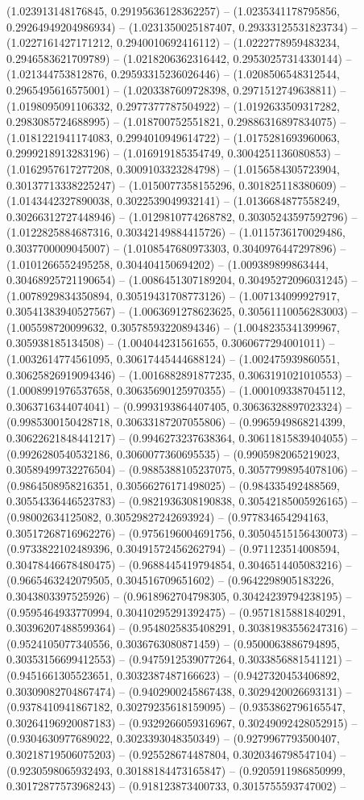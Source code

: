 (1.023913148176845, 0.29195636128362257) -- (1.0235341178795856, 0.29264949204986934) -- (1.0231350025187407, 0.29333125531823734) -- (1.0227161427171212, 0.2940010692416112) -- (1.0222778959483234, 0.2946583621709789) -- (1.0218206362316442, 0.29530257314330144) -- (1.021344753812876, 0.29593315236026446) -- (1.0208506548312544, 0.2965495616575001) -- (1.0203387609728398, 0.2971512749638811) -- (1.0198095091106332, 0.2977377787504922) -- (1.0192633509317282, 0.2983085724688995) -- (1.018700752551821, 0.29886316897834075) -- (1.0181221941174083, 0.2994010949614722) -- (1.0175281693960063, 0.2999218913283196) -- (1.016919185354749, 0.3004251136080853) -- (1.0162957617277208, 0.3009103323284798) -- (1.0156584305723904, 0.30137713338225247) -- (1.0150077358155296, 0.301825118380609) -- (1.0143442327890038, 0.3022539049932141) -- (1.0136684877558249, 0.30266312727448946) -- (1.0129810774268782, 0.30305243597592796) -- (1.0122825884687316, 0.30342149884415726) -- (1.0115736170029486, 0.3037700009045007) -- (1.0108547680973303, 0.3040976447297896) -- (1.0101266552495258, 0.304404150694202) -- (1.009389899863444, 0.30468925721190654) -- (1.0086451307189204, 0.30495272096031245) -- (1.0078929834350894, 0.30519431708773126) -- (1.007134099927917, 0.30541383940527567) -- (1.0063691278623625, 0.30561110056283003) -- (1.005598720099632, 0.30578593220894346) -- (1.0048235341399967, 0.305938185134508) -- (1.004044231561655, 0.3060677294001011) -- (1.0032614774561095, 0.30617445444688124) -- (1.002475939860551, 0.30625826919094346) -- (1.0016882891877235, 0.3063191021010553) -- (1.0008991976537658, 0.30635690125970355) -- (1.0001093387045112, 0.3063716344074041) -- (0.9993193864407405, 0.30636328897023324) -- (0.9985300150428718, 0.30633187207055806) -- (0.9965949868214399, 0.30622621848441217) -- (0.9946273237638364, 0.30611815839404055) -- (0.9926280540532186, 0.3060077360695535) -- (0.9905982065219023, 0.30589499732276504) -- (0.9885388105237075, 0.30577998954078106) -- (0.9864508958216351, 0.30566276171498025) -- (0.984335492488569, 0.30554336446523783) -- (0.9821936308190838, 0.30542185005926165) -- (0.98002634125082, 0.30529827242693924) -- (0.977834654294163, 0.30517268716962276) -- (0.9756196004691756, 0.30504515156430073) -- (0.9733822102489396, 0.30491572456262794) -- (0.971123514008594, 0.30478446678480475) -- (0.9688445419794854, 0.3046514405083216) -- (0.9665463242079505, 0.304516709651602) -- (0.9642298905183226, 0.3043803397525926) -- (0.9618962704798305, 0.30424239794238195) -- (0.9595464933770994, 0.30410295291392475) -- (0.9571815881840291, 0.30396207488599364) -- (0.9548025835408291, 0.30381983556247316) -- (0.9524105077340556, 0.3036763080871459) -- (0.9500063886794895, 0.30353156699412553) -- (0.9475912539077264, 0.3033856881541121) -- (0.9451661305523651, 0.3032387487166623) -- (0.9427320453406892, 0.30309082704867474) -- (0.9402900245867438, 0.3029420026693131) -- (0.9378410941867182, 0.30279235618159095) -- (0.9353862796165547, 0.30264196920087183) -- (0.9329266059316967, 0.30249092428052915) -- (0.9304630977689022, 0.3023393048350349) -- (0.9279967793500407, 0.30218719506075203) -- (0.925528674487804, 0.3020346798547104) -- (0.9230598065932493, 0.30188184473165847) -- (0.9205911986850999, 0.30172877573968243) -- (0.918123873400733, 0.3015755593747002) -- 